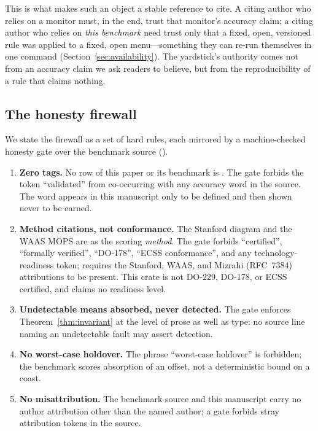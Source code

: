 This is what makes such an object a stable reference to cite. A
citing author who relies on a monitor must, in the end, trust that monitor's
accuracy claim; a citing author who relies on \emph{this benchmark} need trust only
that a fixed, open, versioned rule was applied to a fixed, open menu---something
they can re-run themselves in one command (Section~\ref{sec:availability}). The
yardstick's authority comes not from an accuracy claim we ask readers to believe,
but from the reproducibility of a rule that claims nothing.

\subsection{The honesty firewall}
\label{sec:firewall}

We state the firewall as a set of hard rules, each mirrored by a machine-checked
honesty gate over the benchmark source ().

\begin{enumerate}
  \item \textbf{Zero \Validated{} tags.} No row of this paper or its benchmark is
  \Validated{}. The gate 
  forbids the token ``validated'' from co-occurring with any accuracy word in the
  source. The word appears in this manuscript only to be defined and then shown
  never to be earned.
  \item \textbf{Method citations, not conformance.} The Stanford diagram
  \citep{tossaint2007} and the WAAS MOPS \citep{rtcado229} are \Cited{} as the
  scoring \emph{method}. The gate  forbids
  ``certified'', ``formally verified'', ``DO-178'', ``ECSS conformance'', and any
  technology-readiness token;  requires the
  Stanford, WAAS, and Mizrahi (RFC~7384) attributions to be present. This crate is
  not DO-229, DO-178, or ECSS certified, and claims no readiness level.
  \item \textbf{Undetectable means absorbed, never detected.} The gate
   enforces
  Theorem~\ref{thm:invariant} at the level of prose as well as type: no source line
  naming an undetectable fault may assert detection.
  \item \textbf{No worst-case holdover.} The phrase ``worst-case holdover'' is
  forbidden; the benchmark scores absorption of an offset, not a deterministic
  bound on a coast.
  \item \textbf{No misattribution.} The benchmark source and this manuscript carry
  no author attribution other than the named author; a gate forbids stray
  attribution tokens in the source.
\end{enumerate}

